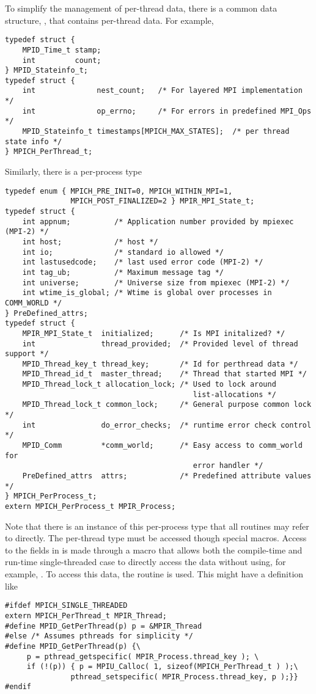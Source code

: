 \documentclass{article}
\begin{document}
To simplify the management of per-thread data, there is a common data
structure, , that contains per-thread data.
For example,
% 
\begin{verbatim}
typedef struct {
    MPID_Time_t stamp;
    int         count;
} MPID_Stateinfo_t;
typedef struct {
    int              nest_count;   /* For layered MPI implementation */
    int              op_errno;     /* For errors in predefined MPI_Ops */
    MPID_Stateinfo_t timestamps[MPICH_MAX_STATES];  /* per thread state info */
} MPICH_PerThread_t;
\end{verbatim}
Similarly, there is a per-process type
\begin{verbatim}
typedef enum { MPICH_PRE_INIT=0, MPICH_WITHIN_MPI=1,
               MPICH_POST_FINALIZED=2 } MPIR_MPI_State_t;
typedef struct {
    int appnum;          /* Application number provided by mpiexec (MPI-2) */
    int host;            /* host */
    int io;              /* standard io allowed */
    int lastusedcode;    /* last used error code (MPI-2) */
    int tag_ub;          /* Maximum message tag */
    int universe;        /* Universe size from mpiexec (MPI-2) */
    int wtime_is_global; /* Wtime is global over processes in COMM_WORLD */
} PreDefined_attrs;
typedef struct {
    MPIR_MPI_State_t  initialized;      /* Is MPI initalized? */
    int               thread_provided;  /* Provided level of thread support */
    MPID_Thread_key_t thread_key;       /* Id for perthread data */
    MPID_Thread_id_t  master_thread;    /* Thread that started MPI */
    MPID_Thread_lock_t allocation_lock; /* Used to lock around 
                                           list-allocations */
    MPID_Thread_lock_t common_lock;     /* General purpose common lock */
    int               do_error_checks;  /* runtime error check control */
    MPID_Comm         *comm_world;      /* Easy access to comm_world for
                                           error handler */
    PreDefined_attrs  attrs;            /* Predefined attribute values */
} MPICH_PerProcess_t;
extern MPICH_PerProcess_t MPIR_Process;
\end{verbatim}
Note that there is an instance of this per-process type that all routines may
refer to directly.  The per-thread type must be accessed though special
macros. 
Access to the fields in  is made through a macro that
allows both the compile-time and run-time single-threaded case to directly
access the data without using, for example, .
To access this data, the routine  is used.  This
might have a definition like
\begin{verbatim}
#ifdef MPICH_SINGLE_THREADED
extern MPICH_PerThread_t MPIR_Thread;
#define MPID_GetPerThread(p) p = &MPIR_Thread
#else /* Assumes pthreads for simplicity */
#define MPID_GetPerThread(p) {\
     p = pthread_getspecific( MPIR_Process.thread_key ); \
     if (!(p)) { p = MPIU_Calloc( 1, sizeof(MPICH_PerThread_t ) );\
               pthread_setspecific( MPIR_Process.thread_key, p );}}
#endif
\end{verbatim}
\end{document}
